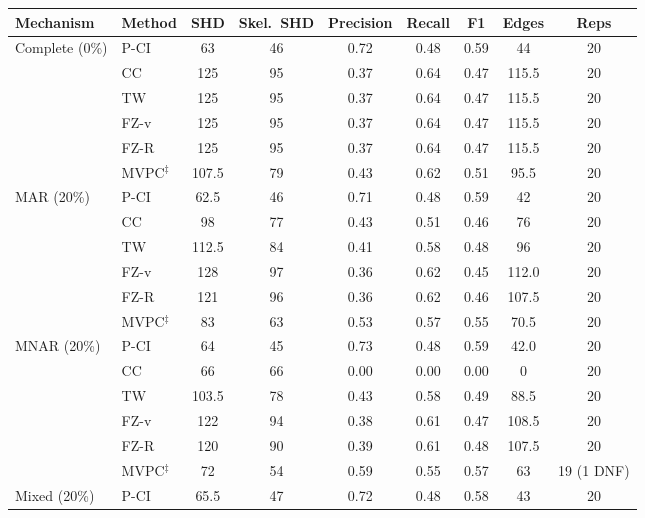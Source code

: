 \begin{tabular}{llccccccc}
    \toprule
    Mechanism & Method & SHD & Skel.\ SHD & Precision & Recall & F1 & Edges & Reps \\
    \midrule
    Complete (0\%)   & P-CI               & 63 & 46 & 0.72 & 0.48 & 0.59 & 44 & 20 \\
                     & CC                 & 125 & 95 & 0.37 & 0.64 & 0.47 & 115.5 & 20 \\
                     & TW                 & 125 & 95 & 0.37 & 0.64 & 0.47 & 115.5 & 20 \\
                     & FZ-v               & 125 & 95 & 0.37 & 0.64 & 0.47 & 115.5 & 20 \\
                     & FZ-R               & 125 & 95 & 0.37 & 0.64 & 0.47 & 115.5 & 20 \\
                     & MVPC$^\ddagger$    & 107.5 & 79 & 0.43 & 0.62 & 0.51 & 95.5 & 20 \\
    \midrule
    MAR (20\%)       & P-CI               & 62.5 & 46 & 0.71 & 0.48 & 0.59 & 42 & 20 \\
                     & CC                 & 98 & 77 & 0.43 & 0.51 & 0.46 & 76 & 20 \\
                     & TW                 & 112.5 & 84 & 0.41 & 0.58 & 0.48 & 96 & 20 \\
                     & FZ-v               & 128 & 97 & 0.36 & 0.62 & 0.45 & 112.0 & 20 \\
                     & FZ-R               & 121 & 96 & 0.36 & 0.62 & 0.46 & 107.5 & 20 \\
                     & MVPC$^\ddagger$    & 83 & 63 & 0.53 & 0.57 & 0.55 & 70.5 & 20 \\
    \midrule
    MNAR (20\%)      & P-CI               & 64 & 45 & 0.73 & 0.48 & 0.59 & 42.0 & 20 \\
                     & CC                 & 66 & 66 & 0.00 & 0.00 & 0.00 & 0 & 20 \\
                     & TW                 & 103.5 & 78 & 0.43 & 0.58 & 0.49 & 88.5 & 20 \\
                     & FZ-v               & 122 & 94 & 0.38 & 0.61 & 0.47 & 108.5 & 20 \\
                     & FZ-R               & 120 & 90 & 0.39 & 0.61 & 0.48 & 107.5 & 20 \\
                     & MVPC$^\ddagger$    & 72 & 54 & 0.59 & 0.55 & 0.57 & 63 & 19 (1 DNF) \\
    \midrule
    Mixed (20\%)     & P-CI               & 65.5 & 47 & 0.72 & 0.48 & 0.58 & 43 & 20 \\

\end{tabular}
